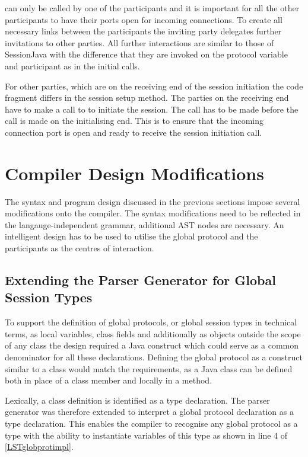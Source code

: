  can only be called by one of the participants and it is important for all the other participants to have their ports open for incoming connections. To create all necessary links between the participants the inviting party delegates further invitations to other parties. All further interactions are similar to those of SessionJava with the difference that they are invoked on the protocol variable and participant as in the initial  calls.

For other parties, which are on the receiving end of the session initiation the code fragment differs in the session setup method. The parties on the receiving end have to make a call to  to initiate the session. The call has to be made before the  call is made on the initialising end. This is to ensure that the incoming connection port is open and ready to receive the session initiation call.

\section{Compiler Design Modifications}

The syntax and program design discussed in the previous sections impose several modifications onto the compiler. The syntax modifications need to be reflected in the langauge-independent grammar, additional AST nodes are necessary. An intelligent design has to be used to utilise the global protocol and the participants as the centres of interaction.

\subsection{Extending the Parser Generator for Global Session Types}
\label{subsec:extendingparsegen}

To support the definition of global protocols, or global session types in technical terms, as local variables, class fields and additionally as objects outside the scope of any class the design required a Java construct which could serve as a common denominator for all these declarations. Defining the global protocol as a construct similar to a class would match the requirements, as a Java class can be defined both in place of a class member and locally in a method. 

Lexically, a class definition is identified as a type declaration. The parser generator was therefore extended to interpret a global protocol declaration as a type declaration. This enables the compiler to recognise any global protocol as a type with the ability to instantiate variables of this type as shown in line 4 of \autoref{LSTglobprotimpl}.

